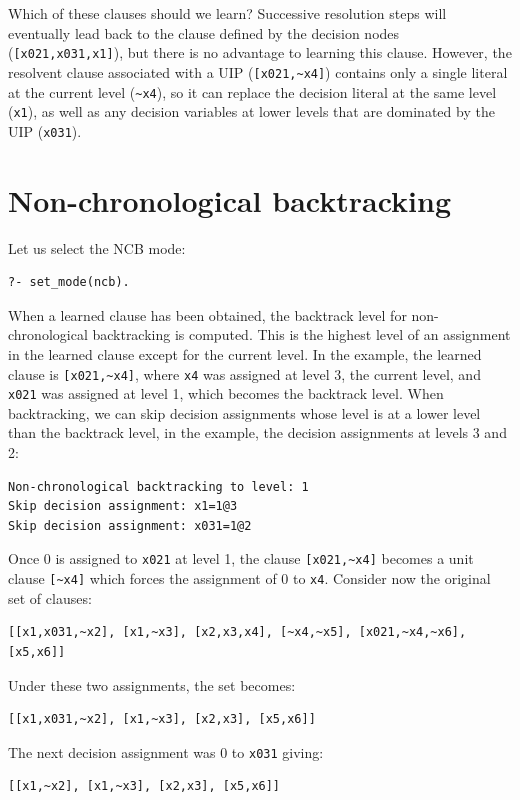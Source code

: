 \documentclass[11pt]{report}
\newcommand*{\p}[1]{\textup{\texttt{#1}}}
\begin{document}
Which of these clauses should we learn? Successive resolution steps will
eventually lead back to the clause defined by the decision nodes
(\verb+[x021,x031,x1]+), but there is no advantage to learning this
clause. However, the resolvent clause associated with a UIP
(\verb+[x021,~x4]+) contains only a single literal at the current level
(\verb+~x4+), so it can replace the decision literal at the same level
(\verb+x1+), as well as any decision variables at lower levels that are
dominated by the UIP (\verb+x031+).


\clearpage

\section{Non-chronological backtracking}

Let us select the NCB mode:
\begin{verbatim}
?- set_mode(ncb).
\end{verbatim}

When a learned clause has been obtained, the backtrack level for
non-chronological backtracking is computed. This is the highest level of
an assignment in the learned clause except for the current level. In the
example, the learned clause is \verb+[x021,~x4]+, where \p{x4} was
assigned at level 3, the current level, and \p{x021} was assigned at
level 1, which becomes the backtrack level. When backtracking, we can
skip decision assignments whose level is at a lower level than the
backtrack level, in the example, the decision assignments at levels 3
and 2:

\begin{verbatim}
Non-chronological backtracking to level: 1
Skip decision assignment: x1=1@3
Skip decision assignment: x031=1@2
\end{verbatim}

Once 0 is assigned to \p{x021} at level 1, the clause \verb+[x021,~x4]+
becomes a unit clause \verb+[~x4]+ which forces the assignment of 0 to
\p{x4}. Consider now the original set of clauses:

\begin{verbatim}
[[x1,x031,~x2], [x1,~x3], [x2,x3,x4], [~x4,~x5], [x021,~x4,~x6], [x5,x6]]
\end{verbatim}
Under these two assignments, the set becomes:
\begin{verbatim}
[[x1,x031,~x2], [x1,~x3], [x2,x3], [x5,x6]]
\end{verbatim}
The next decision assignment was 0 to \p{x031} giving:
\begin{verbatim}
[[x1,~x2], [x1,~x3], [x2,x3], [x5,x6]]
\end{verbatim}
\end{document}
